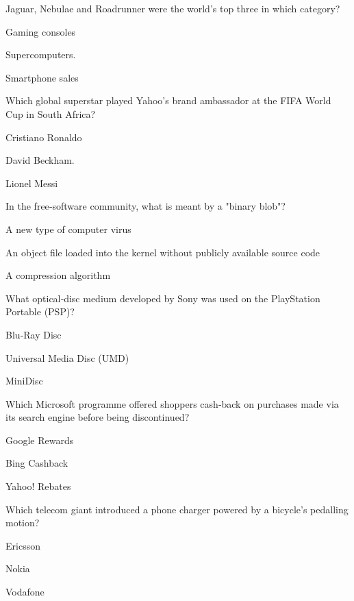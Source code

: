 \begin{enhancedmcq}{Jaguar, Nebulae and Roadrunner were the world's top three in which category?}
\item Gaming consoles
\item Supercomputers.
\item Smartphone sales

\end{enhancedmcq}
\begin{enhancedmcq}{Which global superstar played Yahoo's brand ambassador at the FIFA World Cup in South Africa?}
\item Cristiano Ronaldo
\item David Beckham.
\item Lionel Messi

\end{enhancedmcq}
\begin{enhancedmcq}{In the free‑software community, what is meant by a "binary blob"?}
\item A new type of computer virus
\item An object file loaded into the kernel without publicly available source code
\item A compression algorithm

\end{enhancedmcq}
\begin{enhancedmcq}{What optical‑disc medium developed by Sony was used on the PlayStation Portable (PSP)?}
\item Blu‑Ray Disc
\item Universal Media Disc (UMD)
\item MiniDisc

\end{enhancedmcq}
\begin{enhancedmcq}{Which Microsoft programme offered shoppers cash‑back on purchases made via its search engine before being discontinued?}
\item Google Rewards
\item Bing Cashback
\item Yahoo! Rebates

\end{enhancedmcq}
\begin{enhancedmcq}{Which telecom giant introduced a phone charger powered by a bicycle's pedalling motion?}
\item Ericsson
\item Nokia
\item Vodafone

\end{enhancedmcq}
